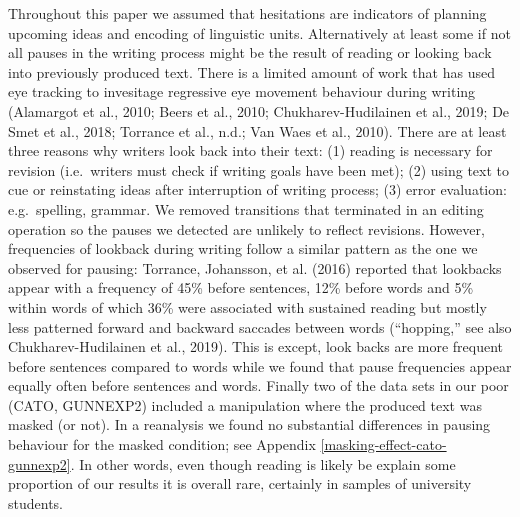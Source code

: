 \documentclass[
  english,
  man,floatsintext]{apa7}
\begin{document}
Throughout this paper we assumed that hesitations are indicators of planning upcoming ideas and encoding of linguistic units. Alternatively at least some if not all pauses in the writing process might be the result of reading or looking back into previously produced text. There is a limited amount of work that has used eye tracking to invesitage regressive eye movement behaviour during writing (Alamargot et al., 2010; Beers et al., 2010; Chukharev-Hudilainen et al., 2019; De Smet et al., 2018; Torrance et al., n.d.; Van Waes et al., 2010). There are at least three reasons why writers look back into their text: (1) reading is necessary for revision (i.e.~writers must check if writing goals have been met); (2) using text to cue or reinstating ideas after interruption of writing process; (3) error evaluation: e.g.~spelling, grammar. We removed transitions that terminated in an editing operation so the pauses we detected are unlikely to reflect revisions. However, frequencies of lookback during writing follow a similar pattern as the one we observed for pausing: Torrance, Johansson, et al. (2016) reported that lookbacks appear with a frequency of 45\% before sentences, 12\% before words and 5\% within words of which 36\% were associated with sustained reading but mostly less patterned forward and backward saccades between words ({``hopping,''} see also Chukharev-Hudilainen et al., 2019). This is except, look backs are more frequent before sentences compared to words while we found that pause frequencies appear equally often before sentences and words. Finally two of the data sets in our poor (CATO, GUNNEXP2) included a manipulation where the produced text was masked (or not). In a reanalysis we found no substantial differences in pausing behaviour for the masked condition; see Appendix \ref{masking-effect-cato-gunnexp2}. In other words, even though reading is likely be explain some proportion of our results it is overall rare, certainly in samples of university students.
\end{document}

